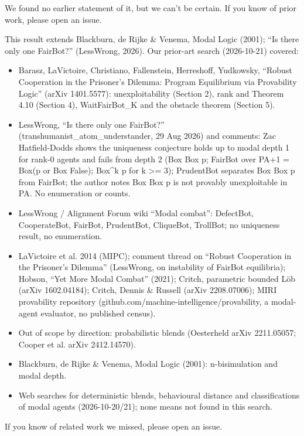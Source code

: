 \documentclass{article}
\begin{document}
We found no earlier statement of it, but we can't be certain. If you know of prior work, please open an issue.

This result extends Blackburn, de Rijke \& Venema, Modal Logic (2001); ``Is there only one FairBot?'' (LessWrong, 2026). Our prior-art search (2026-10-21) covered:

\begin{itemize}
\item Barasz, LaVictoire, Christiano, Fallenstein, Herreshoff, Yudkowsky, ``Robust Cooperation in the Prisoner's Dilemma: Program Equilibrium via Provability Logic'' (arXiv 1401.5577): unexploitability (Section 2), rank and Theorem 4.10 (Section 4), WaitFairBot\_K and the obstacle theorem (Section 5).
\item LessWrong, ``Is there only one FairBot?'' (transhumanist\_atom\_understander, 29 Aug 2026) and comments: Zac Hatfield-Dodds shows the uniqueness conjecture holds up to modal depth 1 for rank-0 agents and fails from depth 2 (Box Box p; FairBot over PA+1 = Box(p or Box False); Box\textasciicircum{}k p for k \textgreater{}= 3); PrudentBot separates Box Box p from FairBot; the author notes Box Box p is not provably unexploitable in PA. No enumeration or counts.
\item LessWrong / Alignment Forum wiki ``Modal combat'': DefectBot, CooperateBot, FairBot, PrudentBot, CliqueBot, TrollBot; no uniqueness result, no enumeration.
\item LaVictoire et al. 2014 (MIPC); comment thread on ``Robust Cooperation in the Prisoner's Dilemma'' (LessWrong, on instability of FairBot equilibria); Hobson, ``Yet More Modal Combat'' (2021); Critch, parametric bounded Löb (arXiv 1602.04184); Critch, Dennis \& Russell (arXiv 2208.07006); MIRI provability repository (github.com/machine-intelligence/provability, a modal-agent evaluator, no published census).
\item Out of scope by direction: probabilistic blends (Oesterheld arXiv 2211.05057; Cooper et al. arXiv 2412.14570).
\item Blackburn, de Rijke \& Venema, Modal Logic (2001): n-bisimulation and modal depth.
\item Web searches for deterministic blends, behavioural distance and classifications of modal agents (2026-10-20/21); none means not found in this search.
\end{itemize}

If you know of related work we missed, please open an issue.
\end{document}
